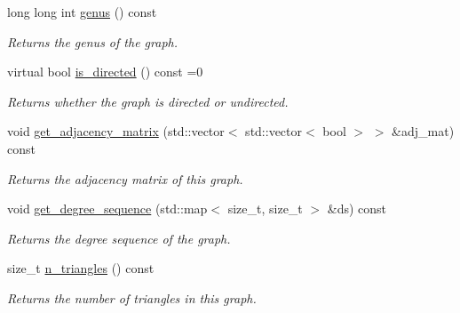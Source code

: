 \begin{DoxyCompactItemize}
long long int \hyperlink{classlgraph_1_1xxgraph_a5f48a91046766e3e0b71a3326f2b9153}{genus} () const
\begin{DoxyCompactList}\small\item\em Returns the genus of the graph. \end{DoxyCompactList}\item 
virtual bool \hyperlink{classlgraph_1_1xxgraph_a0a606d77cbbb2efa7056b82c3b8c395c}{is\+\_\+directed} () const =0
\begin{DoxyCompactList}\small\item\em Returns whether the graph is directed or undirected. \end{DoxyCompactList}\item 
\mbox{\label{classlgraph_1_1xxgraph_a8108bac3649acfae39a45e6de2b339b6}} 
void \hyperlink{classlgraph_1_1xxgraph_a8108bac3649acfae39a45e6de2b339b6}{get\+\_\+adjacency\+\_\+matrix} (std\+::vector$<$ std\+::vector$<$ bool $>$ $>$ \&adj\+\_\+mat) const
\begin{DoxyCompactList}\small\item\em Returns the adjacency matrix of this graph. \end{DoxyCompactList}\item 
void \hyperlink{classlgraph_1_1xxgraph_a5b21b51f5f9c55c05c0e8e5bc836bf87}{get\+\_\+degree\+\_\+sequence} (std\+::map$<$ size\+\_\+t, size\+\_\+t $>$ \&ds) const
\begin{DoxyCompactList}\small\item\em Returns the degree sequence of the graph. \end{DoxyCompactList}\item 
size\+\_\+t \hyperlink{classlgraph_1_1xxgraph_a90a9b60caf18179576af61dc962b95e3}{n\+\_\+triangles} () const
\begin{DoxyCompactList}\small\item\em Returns the number of triangles in this graph. \end{DoxyCompactList}\end{DoxyCompactItemize}
